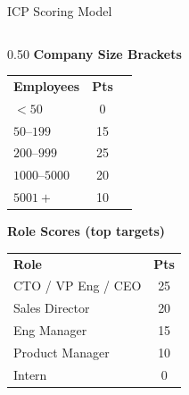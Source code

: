 \documentclass[aspectratio=169,10pt]{beamer}
\begin{document}
\begin{frame}{ICP Scoring Model}
\begin{columns}[T]
\begin{column}{0.50\textwidth}
  \vspace{6pt}
  {\small\bfseries Company Size Brackets}
  \vspace{2pt}
  \centering
  \begin{tabular}{@{}lcc@{}}
    \toprule
    \rowcolor{darkblue}\color{white}\textbf{Employees} & \color{white}\textbf{Pts} \\
    \rowcolor{rowA} $<50$         & 0  \\
    \rowcolor{rowB} $50$--$199$   & 15 \\
    \rowcolor{rowA} $200$--$999$  & 25 \\
    \rowcolor{rowB} $1000$--$5000$ & 20 \\
    \rowcolor{rowA} $5001+$       & 10 \\
    \bottomrule
  \end{tabular}

  \vspace{6pt}
  {\small\bfseries Role Scores (top targets)}
  \vspace{2pt}
  \centering
  \begin{tabular}{@{}lc@{}}
    \toprule
    \rowcolor{darkblue}\color{white}\textbf{Role} & \color{white}\textbf{Pts} \\
    \rowcolor{rowA} CTO / VP Eng / CEO & 25 \\
    \rowcolor{rowB} Sales Director     & 20 \\
    \rowcolor{rowA} Eng Manager         & 15 \\
    \rowcolor{rowB} Product Manager     & 10 \\
    \rowcolor{rowA} Intern              & 0  \\
    \bottomrule
  \end{tabular}
\end{column}
\end{columns}
\end{frame}
\end{document}

